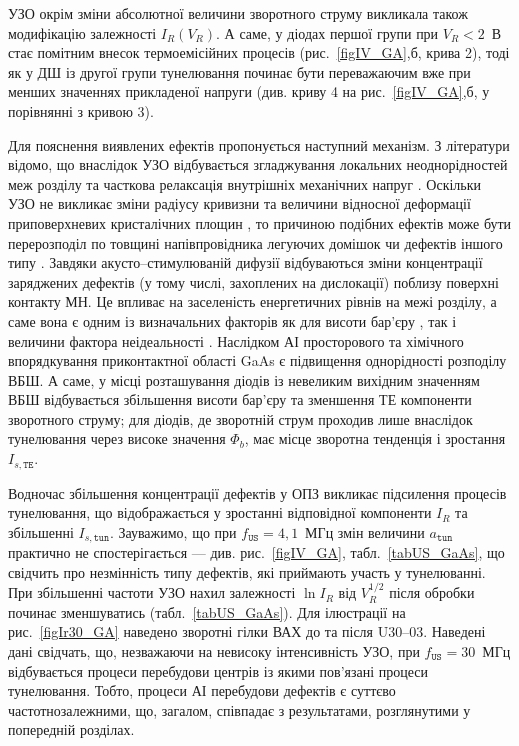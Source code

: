 УЗО окрім зміни абсолютної величини зворотного струму викликала також модифікацію залежності $I_R(V_R)$.
А саме, у діодах першої групи при $V_R<2$~В стає помітним внесок термоемісійних процесів (рис.~\ref{figIV_GA},б, крива 2),
тоді як у ДШ із другої групи тунелювання починає бути переважаючим вже при менших значеннях прикладеної напруги (див. криву 4 на рис.~\ref{figIV_GA},б, у порівнянні з кривою 3).

Для пояснення виявлених ефектів пропонується наступний механізм.
З літератури  відомо, що внаслідок УЗО відбувається згладжування локальних неоднорідностей меж розділу \cite{Parchinskii2003r} та
часткова релаксація внутрішніх механічних напруг \cite{BritunFTT,Zdeb1989}.
Оскільки УЗО не викликає зміни  радіусу кривизни та величини відносної деформації приповерхневих кристалічних площин \cite{UST:SDErmol},
то причиною подібних ефектів може бути перерозподіл по товщині напівпровідника легуючих домішок \cite{Zaver} чи дефектів іншого типу \cite{Ostrov2002FTPr}.
Завдяки акусто--стимулюваній дифузії відбуваються зміни концентрації заряджених дефектів (у тому числі, захоплених на дислокації) поблизу поверхні контакту МН.
  Це впливає на заселеність енергетичних рівнів на межі розділу, а саме вона є одним із визначальних факторів як для висоти бар’єру \cite{Rhoderick1988,Singh1994},
так і величини фактора неідеальності \cite{Ikoma}.
Наслідком АІ просторового та хімічного впорядкування приконтактної області GaAs є підвищення однорідності розподілу ВБШ.
А саме, у місці розташування діодів із невеликим вихідним значенням ВБШ відбувається збільшення висоти бар'єру та зменшення ТЕ компоненти зворотного струму;
 для діодів, де зворотній струм проходив лише внаслідок тунелювання через високе значення $\Phi_b$, має місце зворотна тенденція і зростання $I_{s,\mathtt{TE}}$.

Водночас збільшення концентрації дефектів у ОПЗ викликає підсилення процесів тунелювання, що відображається у зростанні відповідної компоненти $I_R$
та збільшенні $I_{s,\mathtt{tun}}$.
Зауважимо, що при $f_\mathtt{US}=4,1$~МГц змін величини $a_\mathtt{tun}$ практично не спостерігається --- див. рис.~\ref{figIV_GA}, табл.~\ref{tabUS_GaAs},
що свідчить про незмінність типу дефектів, які приймають участь у тунелюванні.
При збільшенні частоти УЗО нахил залежності $\ln I_R$ від $V_R^{1/2}$  після обробки починає зменшуватись (табл.~\ref{tabUS_GaAs}).
Для ілюстрації на рис.~\ref{figIr30_GA} наведено зворотні гілки ВАХ до та після U30--03.
Наведені дані свідчать, що, незважаючи на невисоку інтенсивність УЗО, при $f_\mathtt{US}=30$~МГц відбувається процеси перебудови центрів із якими пов'язані процеси тунелювання.
Тобто, процеси АІ перебудови дефектів є суттєво частотнозалежними, що, загалом, співпадає з результатами, розглянутими у попередній розділах.


